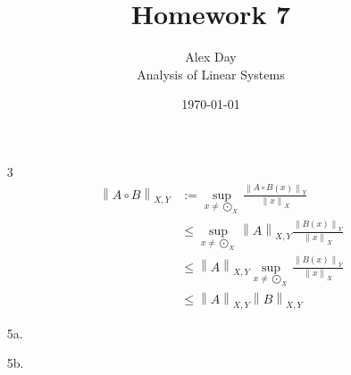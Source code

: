 \documentclass[12pt,fleqn,leqno,letterpaper]{article}
\title{Homework 7}
\author{Alex Day\\
	\small{Analysis of Linear Systems}
}
\date{\today}
\newcommand{\norm}[1]{\left\lVert#1\right\rVert}
\begin{document}
	\maketitle

    \begin{enumerate}
        \item[3]
            \begin{align*}
                \norm{A \circ B}_{X, Y} &:= \sup_{x \ne \bigodot_{X}} \frac{\norm{A \circ B(x)}_{Y}}{\norm{x}_{X}}\\
                &\le \sup_{x \ne \bigodot_{X}} \norm{A}_{X,Y} \frac{\norm{B(x)}_{Y}}{\norm{x}_{X}}\\
                &\le \norm{A}_{X,Y} \sup_{x \ne \bigodot_{X}}  \frac{\norm{B(x)}_{Y}}{\norm{x}_{X}}\\
                &\le \norm{A}_{X,Y} \norm{B}_{X,Y}
            \end{align*}
        \item[5a.]
            \begin{minipage}[t]{\linewidth}
                \raggedright
                \medskip
            \end{minipage}
        \item[5b.]
            \begin{align*}

\end{align*}
\end{enumerate}
\end{document}
